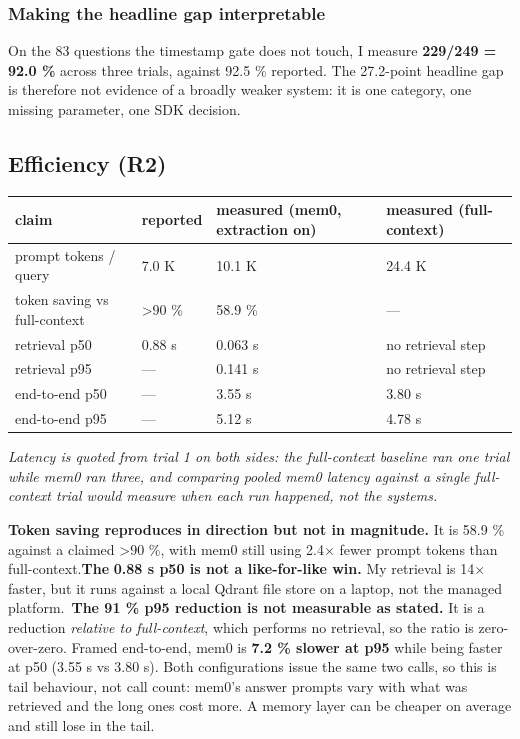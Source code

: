 \documentclass[11pt,a4paper]{article}
\begin{document}
\subsubsection{Making the headline gap interpretable}

On the 83 questions the timestamp gate does not touch, I measure \textbf{229/249 = 92.0 \%} across three trials, against 92.5 \% reported. The 27.2-point headline gap is therefore not evidence of a broadly weaker system: it is one category, one missing parameter, one SDK decision.

\subsection{Efficiency (R2)}

\begin{center}\small
\begin{tabular}{@{}llll@{}}
\toprule
\textbf{claim} & \textbf{reported} & \textbf{measured (mem0, extraction on)} & \textbf{measured (full-context)} \\
\midrule
prompt tokens / query & 7.0 K & 10.1 K & 24.4 K \\
token saving vs full-context & >90 \% & 58.9 \% & --- \\
retrieval p50 & 0.88 s & 0.063 s & no retrieval step \\
retrieval p95 & --- & 0.141 s & no retrieval step \\
end-to-end p50 & --- & 3.55 s & 3.80 s \\
end-to-end p95 & --- & 5.12 s & 4.78 s \\
\bottomrule
\end{tabular}
\end{center}

\emph{Latency is quoted from trial 1 on both sides: the full-context baseline ran one trial while mem0 ran three, and comparing pooled mem0 latency against a single full-context trial would measure when each run happened, not the systems.}

\textbf{Token saving reproduces in direction but not in magnitude.} It is 58.9 \% against a claimed >90 \%, with mem0 still using 2.4$\times$ fewer prompt tokens than full-context.\textbf{The}\textbf{ 0.88 s p50 is not a like-for-like win.} My retrieval is 14$\times$ faster, but it runs against a local Qdrant file store on a laptop, not the managed platform.~\textbf{The 91 \% p95 reduction is not measurable as stated.} It is a reduction \emph{relative to full-context}, which performs no retrieval, so the ratio is zero-over-zero. Framed end-to-end, mem0 is \textbf{7.2 \% slower at p95} while being faster at p50 (3.55 s vs 3.80 s). Both configurations issue the same two calls, so this is tail behaviour, not call count: mem0's answer prompts vary with what was retrieved and the long ones cost more. A memory layer can be cheaper on average and still lose in the tail.
\end{document}
